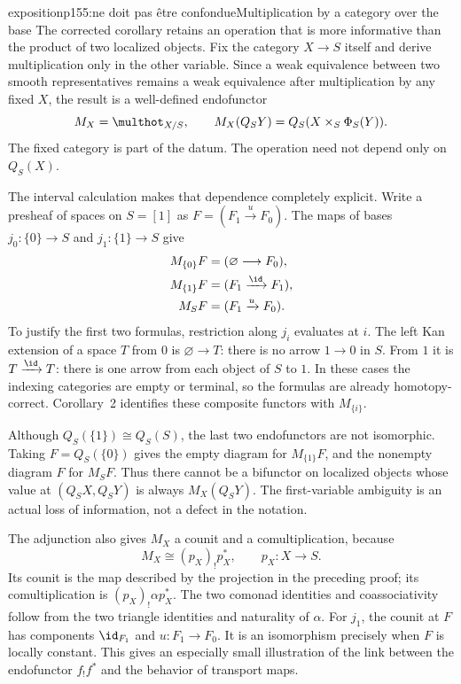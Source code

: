 \begin{dcomment}{exposition}{p155:ne doit pas être confondue}{Multiplication by a category over the base}
The corrected corollary retains an operation that is more informative than the product of two localized objects. Fix the category $X\to S$ itself and derive multiplication only in the other variable. Since a weak equivalence between two smooth representatives remains a weak equivalence after multiplication by any fixed $X$, the result is a well-defined endofunctor
\[
 M_X=\multhot_{X/S},\qquad
 M_X(Q_SY)=Q_S(X\times_S\Phi_S(Y)).
\]
The fixed category is part of the datum. The operation need not depend only on $Q_S(X)$.

The interval calculation makes that dependence completely explicit. Write a presheaf of spaces on $S=[1]$ as $F=(F_1\xrightarrow{u}F_0)$. The maps of bases $j_0:\{0\}\to S$ and $j_1:\{1\}\to S$ give
\[
\begin{aligned}
 M_{\{0\}}F&=(\varnothing\longrightarrow F_0),\\
 M_{\{1\}}F&=(F_1\xrightarrow{\id}F_1),\\
 M_SF&=(F_1\xrightarrow{u}F_0).
\end{aligned}
\]
To justify the first two formulas, restriction along $j_i$ evaluates at $i$. The left Kan extension of a space $T$ from $0$ is $\varnothing\to T$: there is no arrow $1\to0$ in $S$. From $1$ it is $T\xrightarrow{\id}T$: there is one arrow from each object of $S$ to $1$. In these cases the indexing categories are empty or terminal, so the formulas are already homotopy-correct. Corollary~2 identifies these composite functors with $M_{\{i\}}$.

Although $Q_S(\{1\})\cong Q_S(S)$, the last two endofunctors are not isomorphic. Taking $F=Q_S(\{0\})$ gives the empty diagram for $M_{\{1\}}F$, and the nonempty diagram $F$ for $M_SF$. Thus there cannot be a bifunctor on localized objects whose value at $(Q_SX,Q_SY)$ is always $M_X(Q_SY)$. The first-variable ambiguity is an actual loss of information, not a defect in the notation.

The adjunction also gives $M_X$ a counit and a comultiplication, because
\[
 M_X\cong(p_X)_!p_X^*,\qquad p_X:X\to S.
\]
Its counit is the map described by the projection in the preceding proof; its comultiplication is $(p_X)_!\alpha p_X^*$. The two comonad identities and coassociativity follow from the two triangle identities and naturality of $\alpha$. For $j_1$, the counit at $F$ has components $\id_{F_1}$ and $u:F_1\to F_0$. It is an isomorphism precisely when $F$ is locally constant. This gives an especially small illustration of the link between the endofunctor $f_!f^*$ and the behavior of transport maps.


\end{dcomment}
